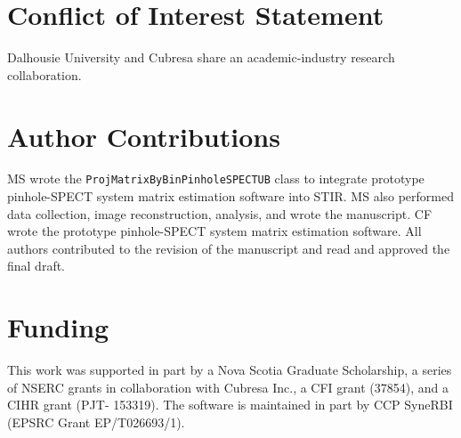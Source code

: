 \documentclass[utf8]{FrontiersinHarvard} %
\begin{document}

\section*{Conflict of Interest Statement}
Dalhousie University and Cubresa share an academic-industry research collaboration.



\section*{Author Contributions}
MS wrote the \texttt{ProjMatrixByBinPinholeSPECTUB} class to integrate prototype pinhole-SPECT system matrix estimation software into STIR. MS also performed data collection, image reconstruction, analysis, and wrote the manuscript. CF wrote the prototype pinhole-SPECT system matrix estimation software. All authors contributed to the revision of the manuscript and read and approved the final draft.


\section*{Funding}
This work was supported in part by a Nova Scotia Graduate Scholarship, a series of NSERC grants in collaboration with Cubresa Inc., a CFI grant (37854), and a CIHR grant (PJT- 153319). The software is maintained in part by CCP SyneRBI (EPSRC Grant EP/T026693/1). 
\end{document}
